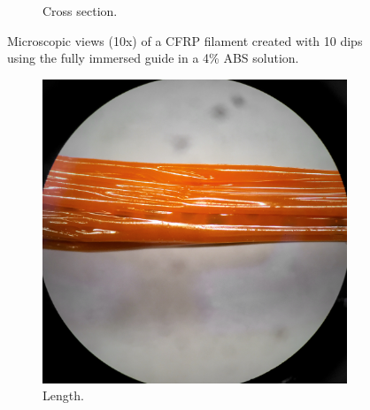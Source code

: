 \begin{figure}[h!]
\begin{subfigure}[b]{0.45\textwidth}
                \caption{Cross section.}
                \label{fig:filament-108-40-dip-end}
        \end{subfigure}
        \caption{Microscopic views (10x) of a CFRP filament created with 10 dips using the fully immersed guide in a 4\% ABS solution.}\label{fig:filament-108-40-dip-microscope}
\end{figure}


\begin{figure}[h!]
        \centering
        \begin{subfigure}[b]{0.45\textwidth}
                \includegraphics[width=\textwidth]{./figures/filament-108-40-flat-side}
                \caption{Length.}
                \label{fig:filament-108-40-flat-side}
        \end{subfigure}
        \begin{subfigure}[b]{0.45\textwidth}

\end{subfigure}
\end{figure}
